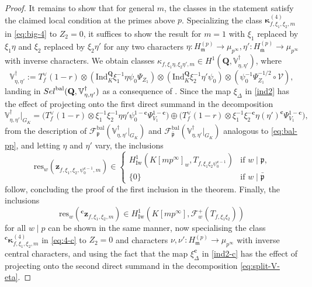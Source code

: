 \documentclass[10pt,letterpaper]{amsart}
\theoremstyle{plain}
\theoremstyle{definition}
\theoremstyle{definition}
\theoremstyle{plain}
\theoremstyle{plain}
\theoremstyle{plain}
\theoremstyle{remark}
\numberwithin{equation}{section}
\newcommand{\cc}{\mathbf{c}}
\newcommand{\ch}{\xi}
\newcommand{\Sel}{Sel}
\newcommand{\pp}{\mathfrak{p}}
\newcommand{\ppbar}{\bar{\mathfrak{p}}}
\newcommand{\fkm}{\mathfrak{m}}
\newcommand{\fkmbar}{\overline{\mathfrak{m}}}
\DeclareMathOperator{\bal}{\mathrm{bal}}
\newcommand{\Q}{\mathbf{Q}}
\def\Sel{{\rm Sel}}
\begin{document}
\begin{proof}
It remains to show that for general $m$, the classes in the statement satisfy the claimed local condition at the primes above $p$. Specializing the class $\boldsymbol{\kappa}_{f,\xi_1,\xi_2,m}^{(4)}$ in \eqref{eq:big-4} to $Z_2=0$, it suffices to show the result for $m=1$ with $\xi_1$ replaced by $\xi_1\eta$ and $\xi_2$ replaced by $\xi_2\eta'$ for any two characters  $\eta:H_{\fkm}^{(p)}\rightarrow\mu_{p^\infty}, \eta':H_{\fkmbar}^{(p)}\rightarrow\mu_{p^\infty}$ with inverse characters. We obtain classes $\kappa_{f,\xi_1\eta,\xi_2\eta',m}\in H^1(\Q,\mathbb{V}^\dagger_{\eta,\eta'})$, where
\[
\mathbb{V}^\dagger_{\eta,\eta'}:=T_f^\vee(1-r)\otimes({\mathrm{Ind}}_K^\Q\xi_1^{-1}\eta\psi_0\Psi_{Z_1})\otimes({\mathrm{Ind}}_K^\Q\xi_2^{-1}\eta'\psi_0)\otimes(\psi_0^{-1}\Psi_{Z_1}^{-1/2}\circ\mathscr{V}),
\]
landing in $\Sel^{\bal}(\Q,\mathbb{V}_{\eta,\eta'}^\dagger)$ as a consequence of \cite[Cor.~8.2]{BSV}. Since the map $\xi_\Delta$ in \eqref{ind2} has the effect of projecting onto the first direct summand in the decomposition 
\begin{equation}\label{eq:split-V-eta}
\mathbb{V}_{\eta,\eta'}^\dagger\vert_{G_K}=\bigl(T_f^\vee(1-r)\otimes\ch_1^{-1}\ch_2^{-1}\eta\eta'\psi_0^{1-\cc}\Psi_{V_1}^{1-\cc}\bigr)\oplus\bigl(T_f^\vee(1-r)\otimes\ch_1^{-1}\ch_2^{-\cc}\eta(\eta')^\cc\Psi_{V_1}^{1-\cc}\bigr),
\end{equation}
from the description of $\mathscr{F}_\pp^{\bal}(\mathbb{V}_{\eta,\eta'}^\dagger\vert_{G_K})$ and $\mathscr{F}^{\bal}_{\ppbar}(\mathbb{V}_{\eta,\eta'}^\dagger\vert_{G_K})$ analogous to \eqref{eq:bal-pp}, and letting  $\eta$ and $\eta'$ vary, the inclusions
\[
{\mathrm{res}}_w(\mathbf{z}_{f,\xi_1,\xi_2,\psi_0^{\cc-1},m})\in\begin{cases}
H^1_{\mathrm{Iw}}(K[mp^\infty]_w,T_{f,\xi_1\xi_2\psi_0^{\cc-1}})&\textrm{if $w\mid\pp$,}\\[0.2em]
\{0\}&\textrm{if $w\mid\ppbar$}
\end{cases}
\]
follow, concluding the proof of the first inclusion in the theorem. Finally, the inclusions
\[
{\mathrm{res}}_w({}^\cc\mathbf{z}_{f,\xi_1,\xi_2,m})\in H^1_{\mathrm{Iw}}(K[mp^\infty],\mathscr{F}_w^+(T_{f,\xi_1\xi_2}))
\]
for all $w\mid p$ can be shown in the same manner, now specialising the class ${}^\cc\boldsymbol{\kappa}_{f,\xi_1,\xi_2,m}^{(4)}$ in \eqref{eq:4-c} to $Z_2=0$ and characters $\nu,\nu':H_\fkm^{(p)}\rightarrow\mu_{p^\infty}$ with inverse central characters, and using the fact that the map $\xi_\Delta^\cc$ in \eqref{ind2-c} has the effect of projecting onto the second direct summand in the decomposition  \eqref{eq:split-V-eta}.
\end{proof}
\end{document}
